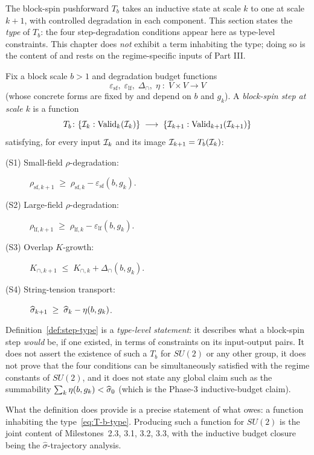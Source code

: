 The block-spin pushforward $T_b$ takes an inductive state at scale $k$ to one at scale $k+1$, with controlled degradation in each component.  This section states the \emph{type} of $T_b$: the four step-degradation conditions appear here as type-level constraints.  This chapter does \emph{not} exhibit a term inhabiting the type; doing so is the content of  and rests on the regime-specific inputs of Part III.

\begin{definition}
\label{def:step-type}
Fix a block scale $b > 1$ and degradation budget functions
\begin{equation*}
  \varepsilon_{\mathrm{sf}}, \;\varepsilon_{\mathrm{lf}}, \;\Delta_{\cap}, \;\eta \;\colon\; V \times V \to V
\end{equation*}
(whose concrete forms are fixed by  and depend on $b$ and $g_k$).  A \emph{block-spin step at scale $k$} is a function
\begin{equation}
  \label{eq:T-b-type}
  T_b \colon \{ \mathcal{I}_k : \mathrm{Valid}_k(\mathcal{I}_k) \} \;\longrightarrow\; \{ \mathcal{I}_{k+1} : \mathrm{Valid}_{k+1}(\mathcal{I}_{k+1}) \}
\end{equation}
satisfying, for every input $\mathcal{I}_k$ and its image $\mathcal{I}_{k+1} = T_b(\mathcal{I}_k)$:
\begin{description}
  \item[\textnormal{(S1) Small-field $\rho$-degradation:}] $\rho_{\mathrm{sf}, k+1} \;\ge\; \rho_{\mathrm{sf}, k} - \varepsilon_{\mathrm{sf}}(b, g_k)$.
  \item[\textnormal{(S2) Large-field $\rho$-degradation:}] $\rho_{\mathrm{lf}, k+1} \;\ge\; \rho_{\mathrm{lf}, k} - \varepsilon_{\mathrm{lf}}(b, g_k)$.
  \item[\textnormal{(S3) Overlap $K$-growth:}] $K_{\cap, k+1} \;\le\; K_{\cap, k} + \Delta_{\cap}(b, g_k)$.
  \item[\textnormal{(S4) String-tension transport:}] $\widehat{\sigma}_{k+1} \;\ge\; \widehat{\sigma}_k - \eta(b, g_k)$.
\end{description}
\end{definition}

\begin{remark}
\label{rem:step-type-scope}
Definition~\ref{def:step-type} is a \emph{type-level statement}: it describes what a block-spin step \emph{would} be, if one existed, in terms of constraints on its input-output pairs.  It does not assert the existence of such a $T_b$ for $SU(2)$ or any other group, it does not prove that the four conditions can be simultaneously satisfied with the regime constants of $SU(2)$, and it does not state any global claim such as the summability $\sum_k \eta(b, g_k) < \widehat{\sigma}_0$ (which is the Phase-3 inductive-budget claim).

What the definition does provide is a precise statement of what  owes: a function inhabiting the type~\eqref{eq:T-b-type}.  Producing such a function for $SU(2)$ is the joint content of Milestones~2.3, 3.1, 3.2, 3.3, with the inductive budget closure being the $\widehat\sigma$-trajectory analysis.
\end{remark}

